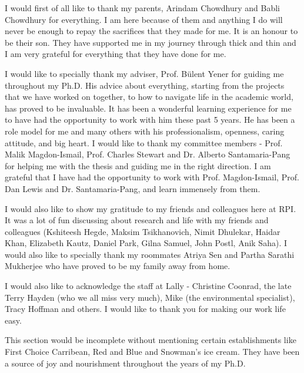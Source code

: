 
I would first of all like to thank my parents, Arindam Chowdhury and Babli Chowdhury for everything. I am here because of them and anything I do will never be enough to repay the sacrifices that they made for me. It is an honour to be their son. They have supported me in my journey through thick and thin and I am very grateful for everything that they have done for me.

I would like to specially  thank my adviser, Prof. B{\"u}lent Yener for guiding me throughout my Ph.D. His advice about everything, starting from the projects that we have worked on together, to how to navigate life in the academic world, has proved to be invaluable. It has been
a wonderful learning experience for me to have had the opportunity to work with
him these past 5 years. He has been a role model for me and many others with his professionalism, openness, caring attitude, and big heart. 
I would  like to thank my committee members - Prof. Malik Magdon-Ismail, Prof. Charles Stewart and Dr. Alberto Santamaria-Pang for helping me with the thesis and guiding me in the right direction.  I am grateful that I have had the opportunity to work with  Prof.  Magdon-Ismail, Prof. Dan Lewis and Dr. Santamaria-Pang, and learn immensely from them.


I would also like to show my gratitude to my friends and colleagues here at RPI. It was a lot of fun discussing about research and life with my friends and colleagues (Kshiteesh Hegde, Maksim Tsikhanovich, Nimit Dhulekar, Haidar Khan, Elizabeth Kautz, Daniel Park, Gilna Samuel, John Postl, Anik Saha).
I would also like to specially thank my roommates Atriya Sen and Partha Sarathi Mukherjee who have proved to be my family away from home.


I would also like to acknowledge the staff at Lally - Christine Coonrad, the late Terry Hayden (who we all miss very much), Mike (the environmental specialist), Tracy Hoffman and others. I would like to thank you for making our work life easy. 

This section would be incomplete without mentioning certain establishments like First Choice Carribean, Red and Blue and Snowman's ice cream. They have been a source of joy and nourishment throughout the years of my Ph.D.